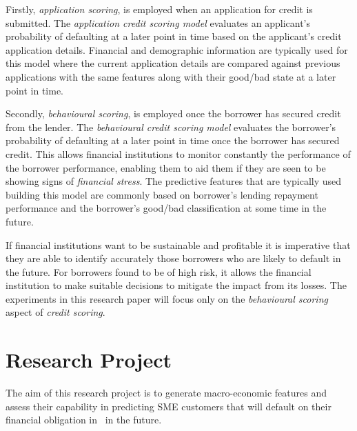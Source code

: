 Firstly, \textit{application scoring}, is employed when an application for credit is submitted. The \textit{application credit scoring model} evaluates an applicant's probability of defaulting at a later point in time based on the applicant's credit application details. Financial and demographic information are typically used for this model where the current application details are compared against previous applications with the same features along with their good/bad state at a later point in time.

Secondly, \textit{behavioural scoring}, is employed once the borrower has secured credit from the lender. The \textit{behavioural credit scoring model} evaluates the borrower's probability of defaulting at a later point in time once the borrower has secured credit. This allows financial institutions to monitor constantly the performance of the borrower performance, enabling them to aid them if they are seen to be showing signs of \textit{financial stress}. The predictive features that are typically used building this model are commonly based on borrower's lending repayment performance and the borrower's good/bad classification at some time in the future. 

If financial institutions want to be sustainable and profitable it is imperative that they are able to identify accurately those borrowers who are likely to default in the future. For borrowers found to be of high risk, it allows the financial institution to make suitable decisions to mitigate the impact from its losses. The experiments in this research paper will focus only on the \textit{behavioural scoring} aspect of \textit{credit scoring}.


\section{Research Project}

The aim of this research project is to generate macro-economic features and assess their capability in predicting SME customers that will default on their financial obligation in \subjectname\ in the future.



